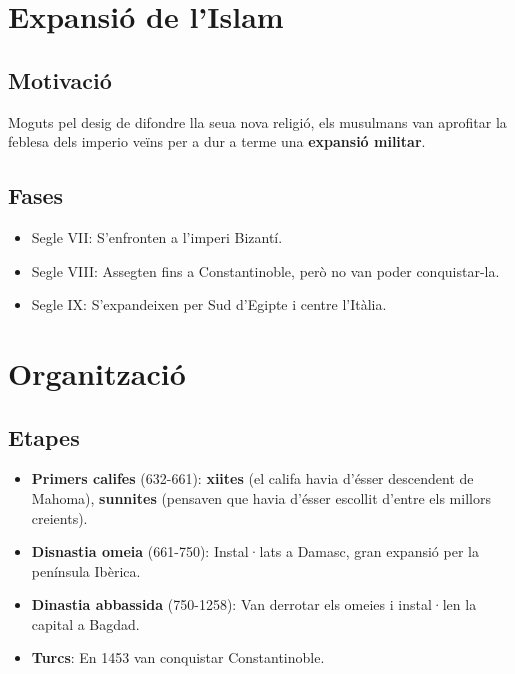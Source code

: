 \section{Expansió de l'Islam}\label{expansiuxf3-de-lislam}

\subsection{Motivació}\label{motivaciuxf3}

Moguts pel desig de difondre lla seua nova religió, els musulmans van
aprofitar la feblesa dels imperio veïns per a dur a terme una
\textbf{expansió militar}.

\subsection{Fases}\label{fases}

\begin{itemize}
\itemsep1pt\parskip0pt
\item
  Segle VII: S'enfronten a l'imperi Bizantí.
\item
  Segle VIII: Assegten fins a Constantinoble, però no van poder
  conquistar-la.
\item
  Segle IX: S'expandeixen per Sud d'Egipte i centre l'Itàlia.
\end{itemize}

\section{Organització}\label{organitzaciuxf3}

\subsection{Etapes}\label{etapes}

\begin{itemize}
\itemsep1pt\parskip0pt
\item
  \textbf{Primers califes} (632-661): \textbf{xiites} (el califa havia
  d'ésser descendent de Mahoma), \textbf{sunnites} (pensaven que havia
  d'ésser escollit d'entre els millors creients).
\item
  \textbf{Disnastia omeia} (661-750): Instal·lats a Damasc, gran
  expansió per la península Ibèrica.
\item
  \textbf{Dinastia abbassida} (750-1258): Van derrotar els omeies i
  instal·len la capital a Bagdad.
\item
  \textbf{Turcs}: En 1453 van conquistar Constantinoble.
\end{itemize}

